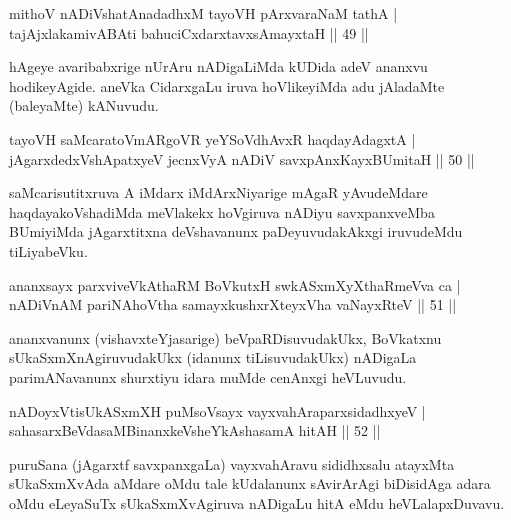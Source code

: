 
\begin{shl}
mithoV nADiVshatAnadadhxM tayoVH pArxvaraNaM tathA |\\
tajAjxlakamivA\s \s BAti bahuciCxdarxtavxsAmayxtaH \hfill || 49 || 
\end{shl}

\begin{artha}
hAgeye avaribabxrige nUrAru nADigaLiMda kUDida adeV ananxvu hodikeyAgide. aneVka CidarxgaLu iruva hoVlikeyiMda adu jAladaMte (baleyaMte) kANuvudu.
\end{artha}


\begin{shl}
tayoVH saMcaratoVmARgoVR yeYSoVdhAvxR haqdayAdagxtA |\\
jAgarxdedxVshApatxyeV jecnxVyA nADiV savxpAnxKayxBUmitaH \hfill || 50 || 
\end{shl}

\begin{artha}
saMcarisutitxruva A iMdarx iMdArxNiyarige mAgaR yAvudeMdare haqdayakoVshadiMda meVlakekx hoVgiruva nADiyu savxpanxveMba BUmiyiMda jAgarxtitxna deVshavanunx paDeyuvudakAkxgi iruvudeMdu tiLiyabeVku.
\end{artha}


\begin{shl}
ananxsayx parxviveVkAthaRM BoVkutxH swkASxmXyXthaRmeVva ca |\\
nADiVnAM pariNAhoV\s tha samayxkushxrXteyxVha vaNayxRteV \hfill || 51 || 
\end{shl}

\begin{artha}
ananxvanunx (vishavxteYjasarige) beVpaRDisuvudakUkx, BoVkatxnu sUkaSxmXnAgiruvudakUkx (idanunx tiLisuvudakUkx) nADigaLa parimANavanunx shurxtiyu idara muMde cenAnxgi heVLuvudu.
\end{artha}

\begin{shl}
nADoyxV\s tisUkASxmXH puMsoV\s sayx vayxvahAraparxsidadhxyeV |\\
sahasarxBeVdasaMBinanxkeVsheYkAshasamA hitAH \hfill || 52 || 
\end{shl}

\begin{artha}
puruSana (jAgarxtf savxpanxgaLa) vayxvahAravu sididhxsalu atayxMta sUkaSxmXvAda aMdare oMdu tale kUdalanunx sAvirArAgi biDisidAga adara oMdu eLeyaSuTx sUkaSxmXvAgiruva nADigaLu hitA eMdu heVLalapxDuvavu.
\end{artha}

